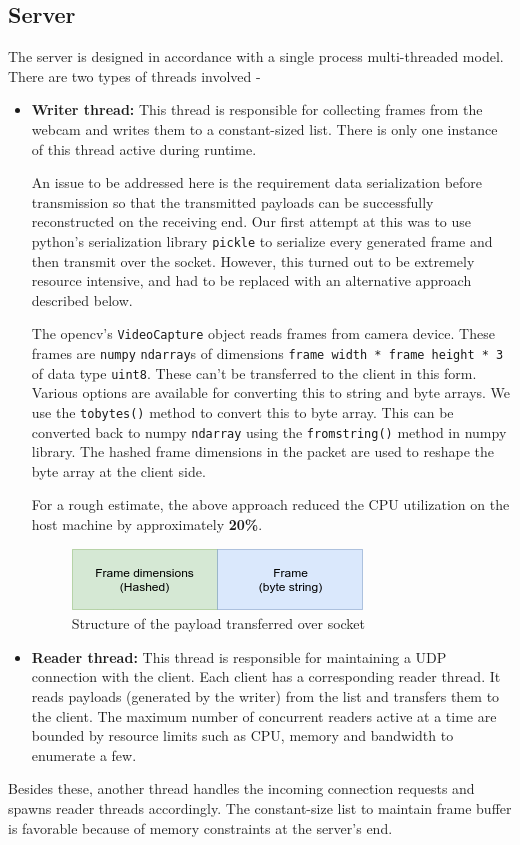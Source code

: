 \documentclass[a4paper]{article}
\begin{document}
  \subsection{Server}
  The server is designed in accordance with a single process multi-threaded model. There are two types of threads involved -
  \begin{itemize}
  \item \textbf{Writer thread:} This thread is responsible for collecting frames from the webcam and writes them to a constant-sized list. There is only one instance of this thread active during runtime. \par
  An issue to be addressed here is the requirement data serialization before transmission so that the transmitted payloads can be successfully reconstructed on the receiving end. Our first attempt at this was to use python's serialization library \texttt{pickle} to serialize every generated frame and then transmit over the socket. However, this turned out to be extremely resource intensive, and had to be replaced with an alternative approach described below. \par
  	The opencv's \texttt{VideoCapture} object reads frames from camera device. These frames are \texttt{numpy} \texttt{ndarray}s of dimensions \texttt{frame width * frame height * 3} of data type \texttt{uint8}. These can't be transferred to the client in this form. Various options are available for converting this to string and byte arrays. We use the \texttt{tobytes()} method to convert this to byte array. This can be converted back to numpy \texttt{ndarray} using the \texttt{fromstring()} method in numpy library. The hashed frame dimensions in the packet are used to reshape the byte array at the client side. \par
    For a rough estimate, the above approach reduced the CPU utilization on the host machine by approximately \textbf{20\%}.
  \begin{figure}[h]
  \centering
  \includegraphics[scale=0.8]{payload_structure.png}
  \caption{Structure of the payload transferred over socket}
  \end{figure}
  \item \textbf{Reader thread:} This thread is responsible for maintaining a UDP connection with the client. Each client has a corresponding reader thread. It reads payloads (generated by the writer) from the list and transfers them to the client. The maximum number of concurrent readers active at a time are bounded by resource limits such as CPU, memory and bandwidth to enumerate a few.
  \end{itemize}
  Besides these, another thread handles the incoming connection requests and spawns reader threads accordingly.
  The constant-size list to maintain frame buffer is favorable because of memory constraints at the server's end.
\end{document}

